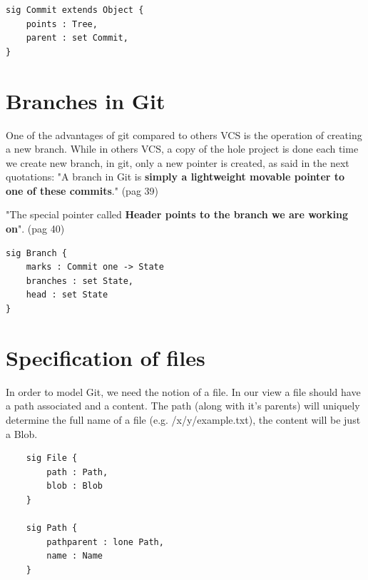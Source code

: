 \begin{lstlisting}
sig Commit extends Object {
	points : Tree,
	parent : set Commit,
}
\end{lstlisting}

\section{Branches in Git}
One of the advantages of git compared to others VCS is the operation
of creating a new branch. While in others VCS, a copy of the hole project is
done each time we create new branch, in git, only a new pointer is created, as
said in the next quotations:
"A branch in Git is {\bf simply a 
lightweight movable pointer to one of these commits}." \cite{progit} (pag 39) \par
"The special pointer called {\bf Header 
points to the branch we are working on}". \cite{progit} (pag 40) \par

\begin{lstlisting}
sig Branch {
	marks : Commit one -> State
	branches : set State,
	head : set State
}
\end{lstlisting}

\section{Specification of files}

In order to model Git, we need the notion of a file. In our view a file should have
a path associated and a content. The path (along with it's parents)
will uniquely determine the full name of a file
(e.g. /x/y/example.txt), the content will be just a Blob.

\begin{lstlisting}
	sig File {
		path : Path,
		blob : Blob
	}

	sig Path {
		pathparent : lone Path,
		name : Name
	}
\end{lstlisting}

